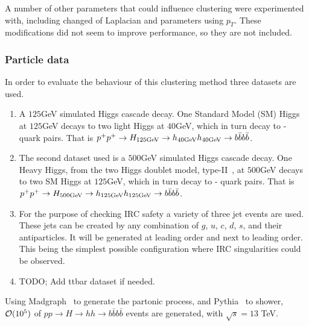 A number of other parameters that could influence clustering were experimented with,
including changed of Laplacian and parameters using \(p_T\).
These modifications did not seem to improve performance, so they are not included.

\subsubsection{Particle data}

    In order to evaluate the behaviour of this clustering method three datasets are used.

    \begin{enumerate}
        \item A \(125\)GeV simulated Higgs cascade decay.
    One Standard Model (SM) Higgs at \(125\)GeV decays to two light Higgs at \(40\)GeV,
    which in turn decay to \beau{}-\bbar{} quark pairs.
    That is \(p^+ p^+ \rightarrow H_{125\text{GeV}} \rightarrow h_{40\text{GeV}} h_{40\text{GeV}} \rightarrow b \bar{b} b \bar{b}\).

     \item The second dataset used is a \(500\)GeV simulated Higgs cascade decay.
         One Heavy Higgs, from the two Higgs doublet model, type-II~\cite{2hdm_modelfile}, at \(500\)GeV decays to two SM Higgs at \(125\)GeV,
    which in turn decay to \beau{}-\bbar{} quark pairs.
    That is \(p^+ p^+ \rightarrow H_{500\text{GeV}} \rightarrow h_{125\text{GeV}} h_{125\text{GeV}} \rightarrow b \bar{b} b \bar{b}\).

    \item For the purpose of checking IRC safety a variety of three jet events are used.
        These jets can be created by any combination of \(g\), \(u\), \(c\), \(d\), \(s\), and their antiparticles.
        It will be generated at leading order and next to leading order.
        This being the simplest possible configuration where IRC singularities could be observed.

     \item {\color{red}TODO; Add ttbar dataset if needed.}

    \end{enumerate}

    Using Madgraph~\cite{alwall_madgraph2011} to generate the partonic process, and Pythia~\cite{sjostrand_pythia2015} to shower, ${\cal O}(10^5)$ of \(pp \rightarrow{} H \rightarrow{} hh \rightarrow{} b\bar{b}b\bar{b}\) events are generated, with $\sqrt{s}=13 $ TeV.


